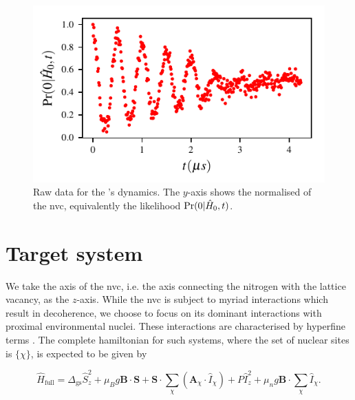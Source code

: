 \begin{figure}[t]
    \begin{center}
        \includegraphics{experimental_study/figures/raw_data.pdf}
    \end{center}
    \caption[Raw data for nitrogen-vacancy centre's dynamics]{
        Raw data for the 's dynamics.
        The $y$-axis shows the normalised  of the \gls{nvc}, 
        equivalently the \gls{likelihood} $\Pr(0 | \hat{H}_0, t)$. 
    }
    \label{fig:nv_raw_data}
\end{figure}

\section{Target system}\label{sec:target_system}
We take the axis of the \gls{nvc}, i.e. the axis connecting the \gls{nitrogen} with the 
    lattice vacancy, as the $z$-axis.
While the \gls{nvc} is subject to myriad interactions which result in decoherence,
    we choose to focus on its dominant interactions with proximal environmental nuclei. 
These interactions are characterised by hyperfine terms \cite{smeltzer201113c}.
The complete \gls{hamiltonian} for such systems, where the set of nuclear sites is $\{\chi\}$,
    is expected to be given by 

\begin{equation}
    \label{eqn:nv_ham_full}
    \hat{H}_{\mathrm{\textrm{full}}} 
    = 
    \Delta_{\textrm{gs}} \hat{S}_z^2 
    + \mu_B g \mathbf{B} \cdot \mathbf{S} 
    + \mathbf{S} \cdot \sum_{\chi} \left( \mathbf{A}_{\chi} \cdot \hat{I}_{\chi} \right) 
    + P \hat{I}_z^2 
    + \mu_n g \mathbf{B} \cdot \sum_{ \chi} \hat{I}_{\chi}.
\end{equation}

